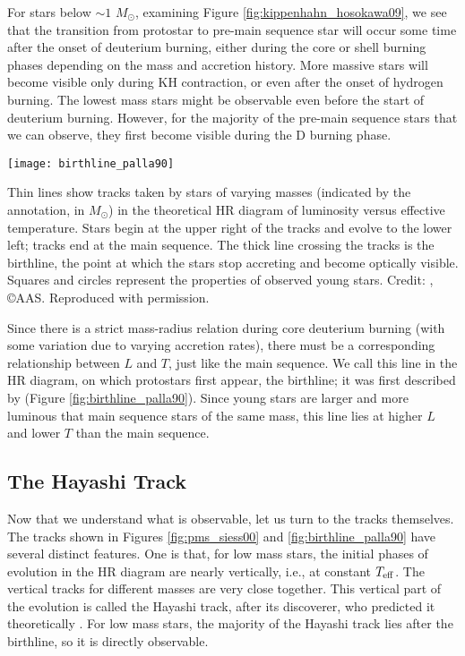 For stars below $\sim 1$ $M_\odot$, examining Figure \ref{fig:kippenhahn_hosokawa09}, we see that the transition from protostar to pre-main sequence star will occur some time after the onset of deuterium burning, either during the core or shell burning phases depending on the mass and accretion history. More massive stars will become visible only during KH contraction, or even after the onset of hydrogen burning. The lowest mass stars might be observable even before the start of deuterium burning. However, for the majority of the pre-main sequence stars that we can observe, they first become visible during the D burning phase.

\begin{marginfigure}
\texttt{[image: birthline\_palla90]}
\caption[The protostellar birthline]{
\label{fig:birthline_palla90}
Thin lines show tracks taken by stars of varying masses (indicated by the annotation, in $M_\odot$) in the theoretical HR diagram of luminosity versus effective temperature. Stars begin at the upper right of the tracks and evolve to the lower left; tracks end at the main sequence. The thick line crossing the tracks is the birthline, the point at which the stars stop accreting and become optically visible. Squares and circles represent the properties of observed young stars. Credit: \citet{palla90a}, \copyright AAS. Reproduced with permission.
}
\end{marginfigure}

Since there is a strict mass-radius relation during core deuterium burning (with some variation due to varying accretion rates), there must be a corresponding relationship between $L$ and $T$, just like the main sequence. We call this line in the HR diagram, on which protostars first appear, the birthline; it was first described by \citet{stahler83a} (Figure \ref{fig:birthline_palla90}). Since young stars are larger and more luminous that main sequence stars of the same mass, this line lies at higher $L$ and lower $T$ than the main sequence.

\subsection{The Hayashi Track}

Now that we understand what is observable, let us turn to the tracks themselves. The tracks shown in Figures \ref{fig:pms_siess00} and \ref{fig:birthline_palla90} have several distinct features. One is that, for low mass stars, the initial phases of evolution in the HR diagram are nearly vertically, i.e., at constant $T_{\rm eff}$. The vertical tracks for different masses are very close together. This vertical part of the evolution is called the Hayashi track, after its discoverer, who predicted it theoretically \citep{hayashi61a}. For low mass stars, the majority of the Hayashi track lies after the birthline, so it is directly observable.

